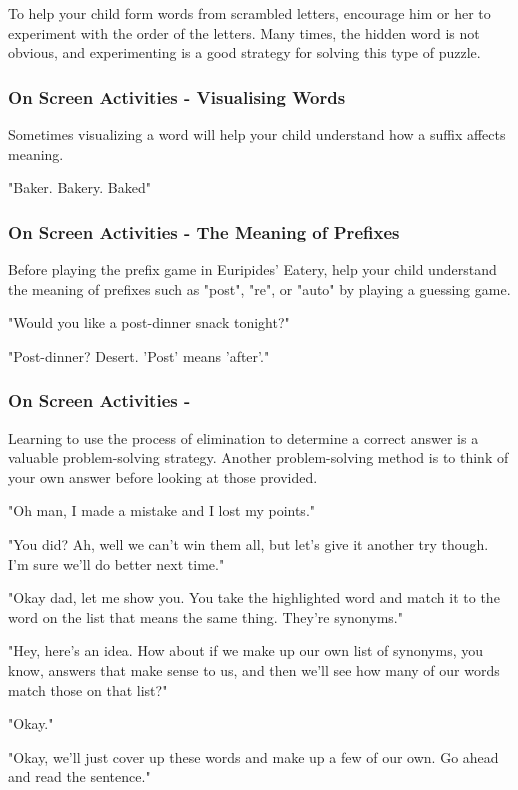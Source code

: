 To help your child form words from scrambled letters, encourage him or her to experiment with the order of the letters.
Many times, the hidden word is not obvious, and experimenting is a good strategy for solving this type of puzzle.

\subsubsection{On Screen Activities - Visualising Words}

Sometimes visualizing a word will help your child understand how a suffix affects meaning.

"Baker. Bakery. Baked"

\subsubsection{On Screen Activities - The Meaning of Prefixes}

Before playing the prefix game in Euripides' Eatery, help your child understand the meaning of prefixes such as "post", "re", or "auto" by playing a guessing game.

"Would you like a post-dinner snack tonight?"

"Post-dinner? Desert. 'Post' means 'after'."

\subsubsection{On Screen Activities - }

Learning to use the process of elimination to determine a correct answer is a valuable problem-solving strategy.
Another problem-solving method is to think of your own answer before looking at those provided.

"Oh man, I made a mistake and I lost my points."

"You did?
Ah, well we can't win them all, but let's give it another try though.
I'm sure we'll do better next time."

"Okay dad, let me show you.
You take the highlighted word and match it to the word on the list that means the same thing.
They're synonyms."

"Hey, here's an idea.
How about if we make up our own list of synonyms, you know, answers that make sense to us, and then we'll see how many of our words match those on that list?"

"Okay."

"Okay, we'll just cover up these words and make up a few of our own.
Go ahead and read the sentence."


